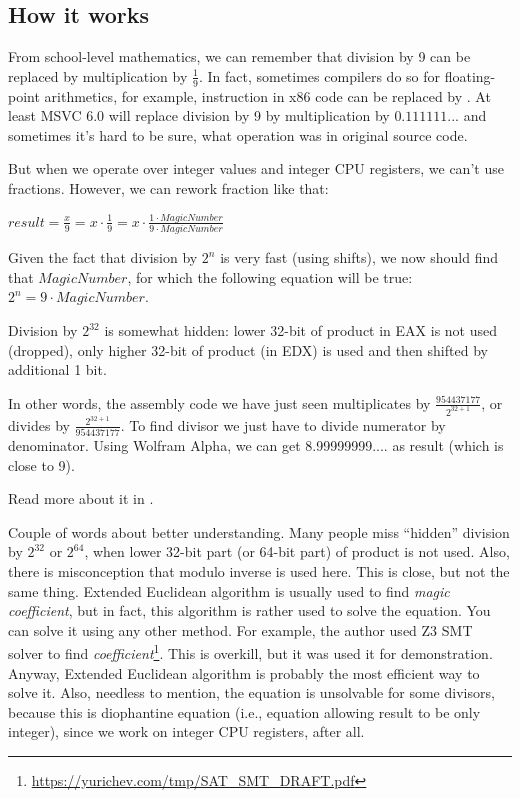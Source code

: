 ﻿\subsection{How it works}

From school-level mathematics, we can remember that division by 9 can be replaced by multiplication by $\frac{1}{9}$.
In fact, sometimes compilers do so for floating-point arithmetics, for example,  instruction in x86 code
can be replaced by .
At least MSVC 6.0 will replace division by 9 by multiplication by $0.111111...$ and sometimes it's hard to be sure,
what operation was in original source code.

But when we operate over integer values and integer CPU registers, we can't use fractions.
However, we can rework fraction like that:

\begin{center}
{\large $result = \frac{x}{9} = x \cdot \frac{1}{9} = x \cdot \frac{1 \cdot MagicNumber}{9 \cdot MagicNumber}$}
\end{center}

Given the fact that division by $2^n$ is very fast (using shifts), we now should find that $MagicNumber$,
for which the following
equation will be true: $2^n = 9 \cdot MagicNumber$.

Division by $2^{32}$ is somewhat hidden: lower 32-bit of product in EAX is not used (dropped), only higher 32-bit of
product (in EDX) is used and then shifted by additional 1 bit.

In other words, the assembly code we have just seen multiplicates by {\Large $\frac{954437177}{2^{32+1}}$},
or divides by {\Large $\frac{2^{32+1}}{954437177}$}.
To find divisor we just have to divide numerator by denominator.
Using Wolfram Alpha, we can get 8.99999999.... as result (which is close to 9).


Read more about it in .

Couple of words about better understanding.
Many people miss ``hidden'' division by $2^{32}$ or $2^{64}$,
when lower 32-bit part (or 64-bit part) of product is not used.
Also, there is misconception that modulo inverse is used here. This is close, but not the same thing.
Extended Euclidean algorithm is usually used to find \textit{magic coefficient}, but in fact,
this algorithm is rather used to solve the equation. You can solve it using any other method.
For example, the author used Z3 SMT solver to find \textit{coefficient}\footnote{\url{https://yurichev.com/tmp/SAT_SMT_DRAFT.pdf}}.
This is overkill, but it was used it for demonstration.
Anyway, Extended Euclidean algorithm is probably the most efficient way to solve it.
Also, needless to mention, the equation is unsolvable for some divisors, because this is diophantine equation
(i.e., equation allowing result to be only integer), since we work on integer CPU registers, after all.

